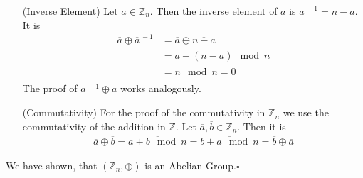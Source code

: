 \documentclass[solution]{tudexercise}
\newcommand{\qed}{\hspace*{\fill}$\square$}
\begin{document}
\begin{enumerate}
\begin{itemize}
				\item[(Inverse Element)]
				Let $\overline{a} \in \mathbb{Z}_n$. Then the inverse element of $\overline{a}$ is $\overline{a}^{\,-1} = \overline{n - a}.$
				It is
				\begin{align*}
\overline{a} \oplus \overline{a}^{\,-1} &= \overline{a} \oplus \overline{n - a}\\
&= \overline{a + (n - a) \mod n}\\
&= \overline{n \mod n} = \overline{0}\\
				\end{align*}
				The proof of $\overline{a}^{\,-1} \oplus \overline{a}$ works analogously.
				
				\item[(Commutativity)]
				For the proof of the commutativity in $\mathbb{Z}_n$ we use the commutativity of the addition in $\mathbb{Z}$. Let $\overline{a}, \overline{b} \in \mathbb{Z}_n$. Then it is
				\begin{align*}
\overline{a} \oplus \overline{b} = \overline{a + b \mod n} = \overline{b + a \mod n} = \overline{b} \oplus \overline{a}
				\end{align*}
				\end{itemize}
				We have shown, that $(\mathbb{Z}_n, \oplus)$ is an Abelian Group.\qed
				

\end{enumerate}
\end{document}
